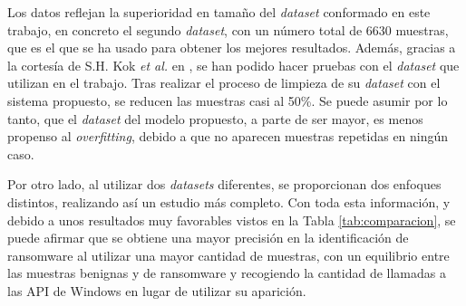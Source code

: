 Los datos reflejan la superioridad en tamaño del \textit{dataset} conformado en este trabajo, en concreto el segundo \textit{dataset}, con un número total de 6630 muestras, que es el que se ha usado para obtener los mejores resultados. Además, gracias a la cortesía de S.H. Kok \textit{et al.} en \cite{Kok2020}, se han podido hacer pruebas con el \textit{dataset} que utilizan en el trabajo. Tras realizar el proceso de limpieza de su \textit{dataset} con el sistema propuesto, se reducen las muestras casi al 50\%. Se puede asumir por lo tanto, que el \textit{dataset} del modelo propuesto, a parte de ser mayor, es menos propenso al \textit{overfitting}, debido a que no aparecen muestras repetidas en ningún caso. 

Por otro lado, al utilizar dos \textit{datasets} diferentes, se proporcionan dos enfoques distintos, realizando así un estudio más completo. Con toda esta información, y debido a unos resultados muy favorables vistos en la Tabla \ref{tab:comparacion}, %
se puede afirmar que se obtiene una mayor precisión en la identificación de ransomware al utilizar una mayor cantidad de muestras, con un equilibrio entre las muestras benignas y de ransomware y recogiendo la cantidad de llamadas a las \gls{API} de Windows en lugar de utilizar su aparición.